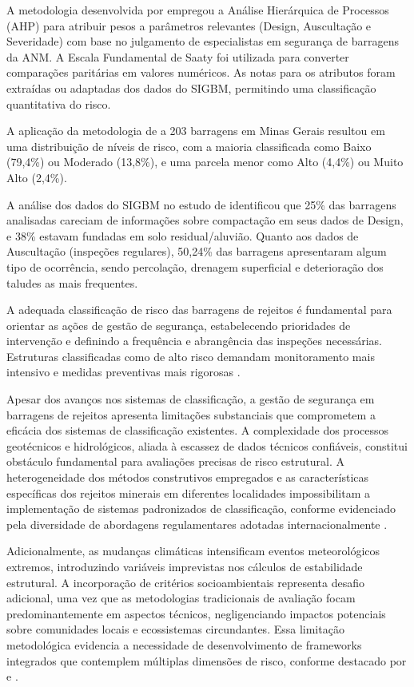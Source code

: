A metodologia desenvolvida por  empregou a Análise Hierárquica de Processos (AHP) para atribuir pesos a parâmetros relevantes (Design, Auscultação e Severidade) com base no julgamento de especialistas em segurança de barragens da ANM. A Escala Fundamental de Saaty foi utilizada para converter comparações paritárias em valores numéricos. As notas para os atributos foram extraídas ou adaptadas dos dados do SIGBM, permitindo uma classificação quantitativa do risco.

A aplicação da metodologia de  a 203 barragens em Minas Gerais resultou em uma distribuição de níveis de risco, com a maioria classificada como Baixo (79,4\%) ou Moderado (13,8\%), e uma parcela menor como Alto (4,4\%) ou Muito Alto (2,4\%).

A análise dos dados do SIGBM no estudo de  identificou que 25\% das barragens analisadas careciam de informações sobre compactação em seus dados de Design, e 38\% estavam fundadas em solo residual/aluvião. Quanto aos dados de Auscultação (inspeções regulares), 50,24\% das barragens apresentaram algum tipo de ocorrência, sendo percolação, drenagem superficial e deterioração dos taludes as mais frequentes.

A adequada classificação de risco das barragens de rejeitos é fundamental para orientar as ações de gestão de segurança, estabelecendo prioridades de intervenção e definindo a frequência e abrangência das inspeções necessárias. Estruturas classificadas como de alto risco demandam monitoramento mais intensivo e medidas preventivas mais rigorosas \cite{geoscan2020, cruz2024}.

Apesar dos avanços nos sistemas de classificação, a gestão de segurança em barragens de rejeitos apresenta limitações substanciais que comprometem a eficácia dos sistemas de classificação existentes. A complexidade dos processos geotécnicos e hidrológicos, aliada à escassez de dados técnicos confiáveis, constitui obstáculo fundamental para avaliações precisas de risco estrutural. A heterogeneidade dos métodos construtivos empregados e as características específicas dos rejeitos minerais em diferentes localidades impossibilitam a implementação de sistemas padronizados de classificação, conforme evidenciado pela diversidade de abordagens regulamentares adotadas internacionalmente \cite{cruz2024}.

Adicionalmente, as mudanças climáticas intensificam eventos meteorológicos extremos, introduzindo variáveis imprevistas nos cálculos de estabilidade estrutural. A incorporação de critérios socioambientais representa desafio adicional, uma vez que as metodologias tradicionais de avaliação focam predominantemente em aspectos técnicos, negligenciando impactos potenciais sobre comunidades locais e ecossistemas circundantes. Essa limitação metodológica evidencia a necessidade de desenvolvimento de frameworks integrados que contemplem múltiplas dimensões de risco, conforme destacado por  e .

